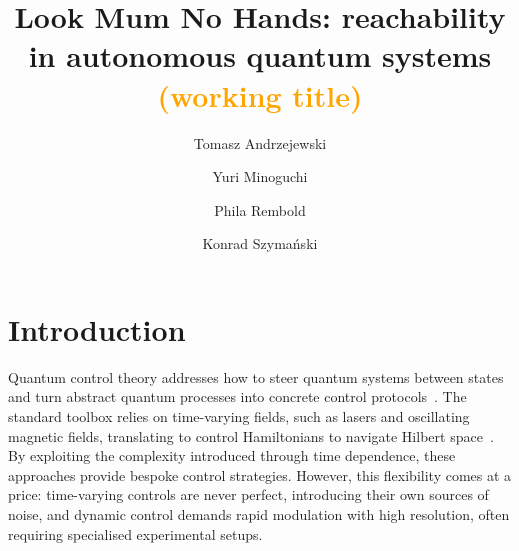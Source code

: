 \documentclass[aps,prx,reprint,superscriptaddress,footnote, twocolumn,notitlepage]{revtex4-2}
\newcommand{\yu}[1]{\textcolor{blue}{#1}}
\newcommand{\tom}[1]{\textcolor{green}{#1}}
\newcommand{\ko}[1]{\textcolor{orange}{#1}}
\newcommand{\ph}[1]{\textcolor{purple}{#1}}
\newcommand{\todoyu}[1]{\yu{$\heartsuit$ #1}}
\newcommand{\todotom}[1]{\tom{$\spadesuit$ #1}}
\newcommand{\todoko}[1]{\ko{$\diamondsuit$ #1}}
\newcommand{\todoph}[1]{\ph{$\clubsuit$ #1}}
\begin{document}
\title{Look Mum No Hands: reachability in autonomous quantum systems \ko{(working title)}}


\author{Tomasz Andrzejewski}

\author{Yuri Minoguchi}


\author{Phila Rembold}

\author{Konrad Szyma\'nski}




\maketitle
\section{Introduction}

Quantum control theory addresses how to steer quantum systems between states and turn abstract quantum processes into concrete control protocols~\cite{koch_quantum_2022,Glaser2015,weidner_energy_2025, ansel_introduction_2024}. The standard toolbox relies on time-varying fields, such as lasers and oscillating magnetic fields, translating to control Hamiltonians to navigate Hilbert space~\cite{theis_counteracting_2018, rodzinka_optimal_2024, Rembold2020}. By exploiting the complexity introduced through time dependence, these approaches provide bespoke control strategies. However, this flexibility comes at a price: time-varying controls are never perfect, introducing their own sources of noise, and dynamic control demands rapid modulation with high resolution, often requiring specialised experimental setups.
\end{document}

